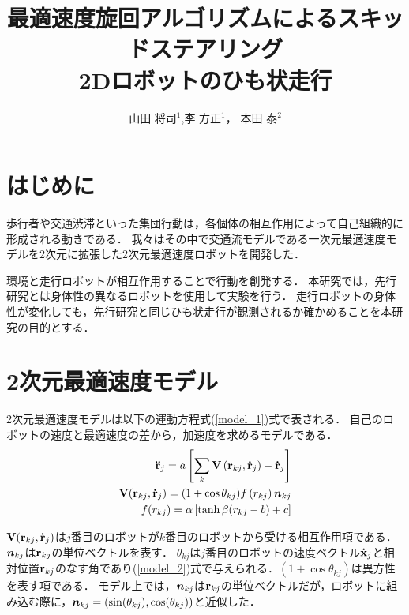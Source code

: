 \documentclass[twocolumn,dvipdfmx]{jarticle}
\title{%
最適速度旋回アルゴリズムによるスキッドステアリング\\
2Dロボットのひも状走行
}
\author{%
山田 将司$^1$,李 方正$^1$， 本田 泰$^2$
}
\affiliation{%
$^1$ 室蘭工業大学大学院 工学研究科 情報電子工学系専攻\\
$^2$ 室蘭工業大学大学院　しくみ解明系領域
}
\begin{document}
\maketitle
\section{はじめに}
\vspace{-2mm}
歩行者や交通渋滞といった集団行動は，各個体の相互作用によって自己組織的に形成される動きである．
我々はその中で交通流モデルである一次元最適速度モデルを2次元に拡張した2次元最適速度ロボットを開発した\cite{mygm}．

環境と走行ロボットが相互作用することで行動を創発する．
本研究では，先行研究\cite{mygm}とは身体性の異なるロボットを使用して実験を行う．
走行ロボットの身体性が変化しても，先行研究\cite{mygm}と同じひも状走行が観測されるか確かめることを本研究の目的とする．

\vspace{-4mm}
\section{2次元最適速度モデル}
2次元最適速度モデルは以下の運動方程式(\ref{model_1})式で表される\cite{ov2}．
自己のロボットの速度と最適速度の差から，加速度を求めるモデルである．
\begin{eqnarray}
\label{model_1}
{\bf \ddot{r}}_{j} = a\left[ \sum_{k} {\bf V} \left({\bf r}_{kj},{\bf \dot{r}}_{j}\right) - {\bf \dot{r}}_{j} \right] \\
\label{model_2}
{\bf V}({\bf {r}}_{kj} , {\bf \dot{r}}_j) = (1+\cos\theta_{kj}) f\left(r_{kj}\right)  \mbox{\boldmath $n$}_{kj} \\
f(r_{kj}) = \alpha  \left[ \tanh\beta(r_{kj} - b ) + c \right]
\label{model_3}
\vspace{-2mm}
\end{eqnarray}

$ {\bf V}({\bf r}_{kj},{\bf \dot{r}}_{j}) $は$j$番目のロボットが$k$番目のロボットから受ける相互作用項である．
$\mbox{\boldmath $n$}_{kj}$は${\bf r}_{kj}$の単位ベクトルを表す．
$\theta_{kj}$は$j$番目のロボットの速度ベクトル${\bf \dot{x}}_j$と相対位置${\bf r}_{kj}$のなす角であり(\ref{model_2})式で与えられる．$(1+\cos\theta_{kj})$は異方性を表す項である．
モデル上では，$\mbox{\boldmath $n$}_{kj}$は${\bf r}_{kj}$の単位ベクトルだが，ロボットに組み込む際に，$\mbox{\boldmath $n$}_{kj} = (\sin(\theta_{kj}),\cos(\theta_{kj}))$と近似した．
\end{document}
